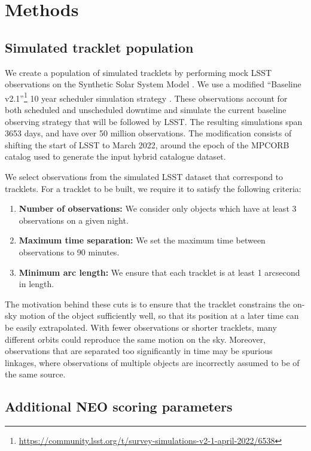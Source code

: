 \documentclass[twocolumn, twocolappendix]{aastex631}
\begin{document}
\section{Methods}

\subsection{Simulated tracklet population}

We create a population of simulated tracklets by performing mock LSST observations on the Synthetic Solar System Model \citep{Grav+2011}. We use a modified ``Baseline v2.1''\footnote{\url{https://community.lsst.org/t/survey-simulations-v2-1-april-2022/6538}} 10 year scheduler simulation strategy \citep{Naghib+2019, Cornwall+2020}. These observations account for both scheduled and unscheduled downtime and simulate the current baseline observing strategy that will be followed by LSST. The resulting simulations span 3653 days, and have over 50 million observations. The modification consists of shifting the start of LSST to March 2022, around the epoch of the MPCORB catalog used to generate the input hybrid catalogue dataset.

We select observations from the simulated LSST dataset that correspond to tracklets. For a tracklet to be built, we require it to satisfy the following criteria:
\begin{enumerate}
    \item \textbf{Number of observations:} We consider only objects which have at least 3 observations on a given night.
    \item \textbf{Maximum time separation:} We set the maximum time between observations to 90 minutes.
    \item \textbf{Minimum arc length:} We ensure that each tracklet is at least 1 arcsecond in length.
\end{enumerate}
The motivation behind these cuts is to ensure that the tracklet constrains the on-sky motion of the object sufficiently well, so that its position at a later time can be easily extrapolated. With fewer observations or shorter tracklets, many different orbits could reproduce the same motion on the sky. Moreover, observations that are separated too significantly in time may be spurious linkages, where observations of multiple objects are incorrectly assumed to be of the same source.

\subsection{Additional NEO scoring parameters}
\end{document}
